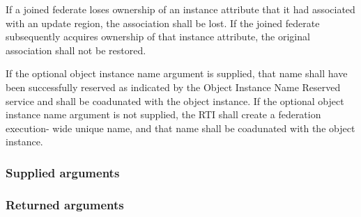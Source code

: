 \begin{compactstdpage}
    If a joined federate loses ownership of an instance attribute that it had associated with an update region, the association shall be lost. If the joined federate subsequently acquires ownership of that instance attribute, the original association shall not be restored.

    If the optional object instance name argument is supplied, that name shall have been successfully reserved as indicated by the Object Instance Name Reserved\rtiinitiated{} service and shall be coadunated with the object instance. If the optional object instance name argument is not supplied, the RTI shall create a federation execution- wide unique name, and that name shall be coadunated with the object instance.

    \subsubsection{Supplied arguments}


    \subsubsection{Returned arguments}


\end{compactstdpage}

\clearpage

